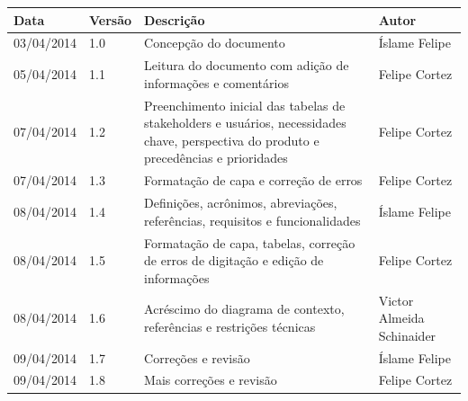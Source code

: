 \documentclass[12pt, a4paper]{article}
\begin{document}
    \begin{tabu}{X[-1] | X[-1, r] | X | X[-1]}
        \hline
        \textbf{Data} &
        \textbf{Versão} &
        \textbf{Descrição} &
        \textbf{Autor}
        \\ \hline

        03/04/2014 &
        1.0 &
        Concepção do documento &
        Íslame Felipe
        \\ \hline

        05/04/2014 &
        1.1 &
        Leitura do documento com adição de informações e comentários &
        Felipe Cortez
        \\ \hline

        07/04/2014 &
        1.2 &
        Preenchimento inicial das tabelas de stakeholders e usuários,
        necessidades chave, perspectiva do produto e precedências e prioridades
        &
        Felipe Cortez
        \\ \hline

        07/04/2014 &
        1.3 &
        Formatação de capa e correção de erros &
        Felipe Cortez
        \\ \hline

        08/04/2014 &
        1.4 &
        Definições, acrônimos, abreviações, referências, requisitos e funcionalidades &
        Íslame Felipe
        \\ \hline

        08/04/2014 &
        1.5 &
        Formatação de capa, tabelas, correção de erros de digitação e edição de
        informações &
        Felipe Cortez
        \\ \hline

        08/04/2014 &
        1.6 &
        Acréscimo do diagrama de contexto, referências e restrições técnicas &
        Victor Almeida \newline Schinaider
        \\ \hline

        09/04/2014 &
        1.7 &
        Correções e revisão &
        Íslame Felipe
        \\ \hline

        09/04/2014 &
        1.8 &
        Mais correções e revisão &
        Felipe Cortez
        \\ \hline
    \end{tabu}

    \newpage

    \tableofcontents

    \newpage
\end{document}
